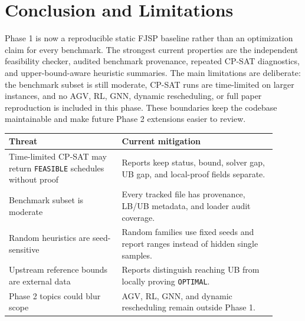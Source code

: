 ﻿\documentclass[11pt]{article}
\begin{document}
\section{Conclusion and Limitations}

Phase 1 is now a reproducible static FJSP baseline rather than an optimization
claim for every benchmark. The strongest current properties are the independent
feasibility checker, audited benchmark provenance, repeated CP-SAT diagnostics,
and upper-bound-aware heuristic summaries. The main limitations are deliberate: the
benchmark subset is still moderate, CP-SAT runs are time-limited on larger
instances, and no AGV, RL, GNN, dynamic rescheduling, or full paper reproduction
is included in this phase. These boundaries keep the codebase maintainable and
make future Phase 2 extensions easier to review.

\begin{table}[h]
\centering
\begin{tabular}{p{0.38\linewidth}p{0.52\linewidth}}
\toprule
Threat & Current mitigation \\
\midrule
Time-limited CP-SAT may return \texttt{FEASIBLE} schedules without proof &
Reports keep status, bound, solver gap, UB gap, and local-proof fields separate. \\
Benchmark subset is moderate &
Every tracked file has provenance, LB/UB metadata, and loader audit coverage. \\
Random heuristics are seed-sensitive &
Random families use fixed seeds and report ranges instead of hidden single samples. \\
Upstream reference bounds are external data &
Reports distinguish reaching UB from locally proving \texttt{OPTIMAL}. \\
Phase 2 topics could blur scope &
AGV, RL, GNN, and dynamic rescheduling remain outside Phase 1. \\
\bottomrule
\end{tabular}
\end{table}
\end{document}
